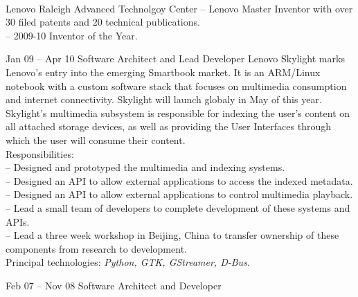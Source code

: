 \documentclass[letterpaper, 11pt]{article}
\begin{document}
    \begin{resume}
        \\[2ex]
        \begin{block}
            \begin{category}{Lenovo}
                 {Raleigh Advanced Technolgoy Center}
                -- Lenovo Master Inventor with over 30 filed patents and 20 technical publications. \\
                -- 2009-10 Inventor of the Year. \\
            \end{category}
            \begin{subcategory}{Jan 09 -- Apr 10}
                 {Software Architect and Lead Developer}
                Lenovo Skylight marks Lenovo's entry into the emerging Smartbook market.
                It is an ARM/Linux notebook with a custom software stack that focuses
                on multimedia consumption and internet connectivity.  Skylight will launch
                globaly in May of this year.
                \\[1ex]
                Skylight's multimedia subsystem is responsible for indexing the user's content on all
                attached storage devices, as well as providing the User Interfaces through which
                the user will consume their content.
                \\[1ex]
                Responsibilities: \\
                -- Designed and prototyped the multimedia and indexing systems. \\
                -- Designed an API to allow external applications to access the indexed metadata. \\
                -- Designed an API to allow external applications to control multimedia playback. \\
                -- Lead a small team of developers to complete development of these systems and APIs. \\
                -- Lead a three week workshop in Beijing, China to transfer ownership of these components from research to development.
                \\[1ex]
                Principal technologies: \emph{Python, GTK, GStreamer, D-Bus}.
                \bigskip
            \end{subcategory}
            \begin{subcategory}{Feb 07 -- Nov 08}
                 {Software Architect and Developer}

\end{subcategory}
\end{block}
\end{resume}
\end{document}
